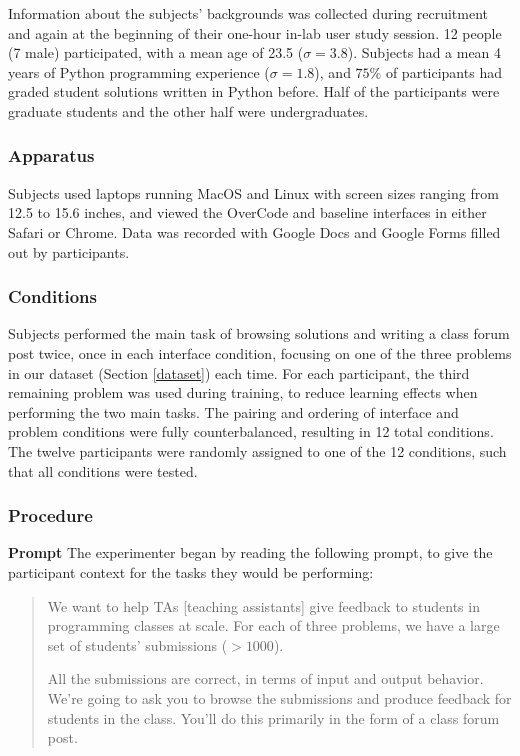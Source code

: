 Information about the subjects' backgrounds was collected during recruitment and again at the beginning of their one-hour in-lab user study session. 12 people (7 male) participated, with a mean age of 23.5 ($\sigma = 3.8$). Subjects had a mean 4 years of Python programming experience ($\sigma = 1.8$), and $75\%$ of participants had graded student solutions written in Python before. Half of the participants were graduate students and the other half were undergraduates.

\subsubsection{Apparatus}

Subjects used laptops running MacOS and Linux with screen sizes ranging from 12.5 to 15.6 inches, and viewed the OverCode and baseline interfaces in either Safari or Chrome. Data was recorded with Google Docs and Google Forms filled out by participants.

\subsubsection{Conditions}

Subjects performed the main task of browsing solutions and writing a class forum post twice, once in each interface condition, focusing on one of the three problems in our dataset (Section \ref{dataset}) each time. For each participant, the third remaining problem was used during training, to reduce learning effects when performing the two main tasks. The pairing and ordering of interface and problem conditions were fully counterbalanced, resulting in 12 total conditions. The twelve participants were randomly assigned to one of the 12 conditions, such that all conditions were tested.

\subsubsection{Procedure}

{\bf Prompt} The experimenter began by reading the following prompt, to give the participant context for the tasks they would be performing:

\begin{quote}

We want to help TAs [teaching assistants] give feedback to students in programming classes at scale. For each of three problems, we have a large set of students' submissions ($> 1000$). 

All the submissions are correct, in terms of input and output behavior. We're going to ask you to browse the submissions and produce feedback for students in the class. You'll do this primarily in the form of a class forum post.
\end{quote}

